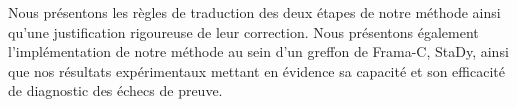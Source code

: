 {  Nous présentons les règles de traduction des deux étapes de notre méthode
  ainsi qu'une justification rigoureuse de leur correction.
  Nous présentons également l'implémentation de notre méthode au sein d'un
  greffon de Frama-C, StaDy, ainsi que nos résultats expérimentaux mettant en
  évidence sa capacité et son efficacité de diagnostic des échecs de preuve.
}
